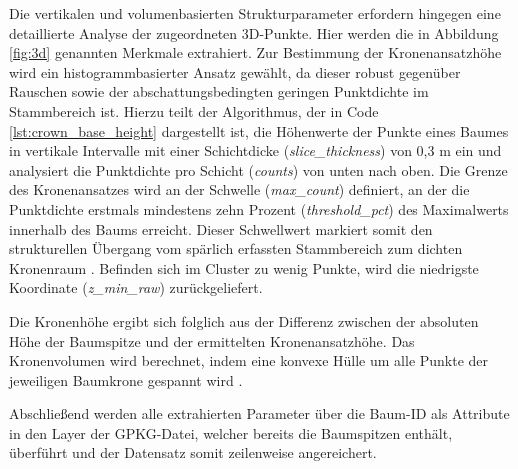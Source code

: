 Die vertikalen und volumenbasierten  Strukturparameter erfordern hingegen eine detaillierte Analyse der zugeordneten 3D-Punkte. Hier werden die in Abbildung \ref{fig:3d} genannten Merkmale extrahiert. Zur Bestimmung der Kronenansatzhöhe wird ein histogrammbasierter Ansatz gewählt, da dieser robust gegenüber Rauschen sowie der abschattungsbedingten geringen Punktdichte im Stammbereich ist. Hierzu teilt der Algorithmus, der in Code \ref{lst:crown_base_height} dargestellt ist, die Höhenwerte der Punkte eines Baumes in vertikale Intervalle mit einer Schichtdicke  (\textit{slice\_thickness}) von 0,3 m ein und analysiert die Punktdichte pro Schicht (\textit{counts}) von unten nach oben. Die Grenze des Kronenansatzes wird an der Schwelle (\textit{max\_count}) definiert, an der die Punktdichte erstmals mindestens zehn Prozent (\textit{threshold\_pct}) des Maximalwerts innerhalb des Baums erreicht. Dieser Schwellwert markiert somit den strukturellen Übergang vom spärlich erfassten Stammbereich zum dichten Kronenraum \cite{zotero-item-73}. Befinden sich im Cluster zu wenig Punkte, wird die niedrigste Koordinate (\textit{z\_min\_raw}) zurückgeliefert.

Die Kronenhöhe ergibt sich folglich aus der Differenz zwischen der absoluten Höhe der Baumspitze und der ermittelten Kronenansatzhöhe. Das Kronenvolumen wird berechnet, indem eine konvexe Hülle um alle Punkte der jeweiligen Baumkrone gespannt wird \cite{munzingerMappingUrbanForest2022}. 

Abschließend werden alle extrahierten Parameter über die Baum-ID als Attribute in den Layer der GPKG-Datei, welcher bereits die Baumspitzen enthält, überführt und der Datensatz somit zeilenweise angereichert.